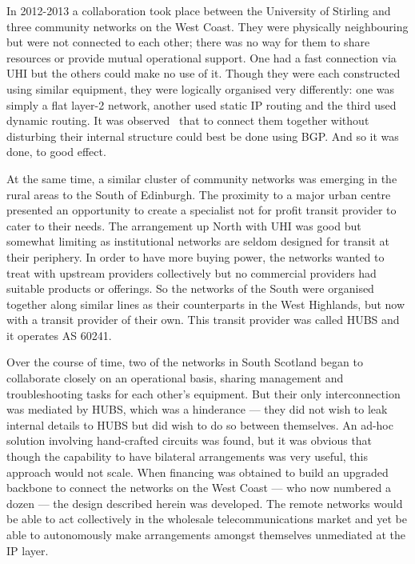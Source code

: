 In 2012-2013 a collaboration took place between the University of
Stirling and three community networks on the West Coast. They were
physically neighbouring but were not connected to each other; there
was no way for them to share resources or provide mutual operational
support. One had a fast connection via \ac{UHI} but the others could
make no use of it. Though they were each constructed using similar
equipment, they were logically organised very differently: one was
simply a flat layer-2 network, another used static IP routing and the
third used dynamic routing. It was observed~\cite{waites2014ripe} that
to connect them together without disturbing their internal structure
could best be done using \ac{BGP}. And so it was done, to good effect.

At the same time, a similar cluster of community networks was emerging
in the rural areas to the South of Edinburgh. The proximity to a major
urban centre presented an opportunity to create a specialist not for
profit transit provider to cater to their needs. The arrangement up
North with \ac{UHI} was good but somewhat limiting as institutional
networks are seldom designed for transit at their periphery. In order
to have more buying power, the networks wanted to treat with upstream
providers collectively but no commercial providers had suitable
products or offerings. So the networks of the South were organised
together along similar lines as their counterparts in the West
Highlands, but now with a transit provider of their own. This transit
provider was called HUBS and it operates \ac{AS} 60241.

Over the course of time, two of the networks in South Scotland began
to collaborate closely on an operational basis, sharing management and
troubleshooting tasks for each other's equipment. But their only
interconnection was mediated by HUBS, which was a hinderance --- they
did not wish to leak internal details to HUBS but did wish to do so
between themselves. An ad-hoc solution involving hand-crafted circuits
was found, but it was obvious that though the capability to have
bilateral arrangements was very useful, this approach would not scale.
When financing was obtained to build an upgraded backbone to connect
the networks on the West Coast --- who now numbered a dozen --- the
design described herein was developed. The remote networks would be
able to act collectively in the wholesale telecommunications market
and yet be able to autonomously make arrangements amongst themselves
unmediated at the IP layer.
